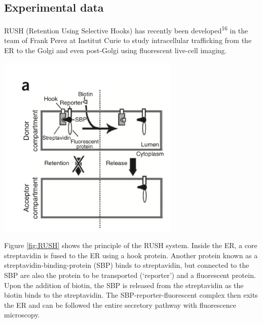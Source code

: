\documentclass{Dissertate}
\let\origfigure\figure
\let\endorigfigure\endfigure
\renewenvironment{figure}[1][2] {
    \expandafter\origfigure\expandafter[H]
} {
    \endorigfigure
}
\begin{document}
\hypertarget{experimental-data}{%
\subsection{Experimental data}\label{experimental-data}}

RUSH (Retention Using Selective
Hooks) has recently been developed\textsuperscript{16} in the team of
Frank Perez at Institut Curie to study intracellular trafficking from the ER to the Golgi and even
post-Golgi using fluorescent live-cell imaging.

\begin{figure}
\hypertarget{fig:RUSH}{%
\centering
\includegraphics[width=0.65\textwidth]{source/figures/png/RUSH.png}
\caption{Schematic overview of the RUSH system. Image taken from
16}\label{fig:RUSH}
}
\end{figure}

Figure \ref{fig:RUSH} shows the principle of the RUSH system.
Inside the ER, a core streptavidin is fused to the ER using a hook protein.
Another protein known as a streptavidin-binding-protein (SBP) binds to
streptavidin, but connected to the SBP are also the protein to be
transported (`reporter') and a fluorescent protein. Upon the addition of
biotin, the SBP is released from the streptavidin as the biotin binds to
the streptavidin. The SBP-reporter-fluorescent complex then exits the ER and can be
followed the entire secretory pathway with fluorescence microscopy. 
\end{document}

